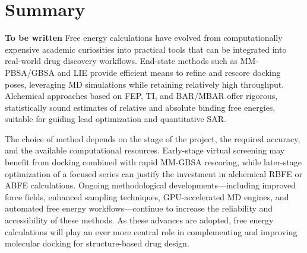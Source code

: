 \documentclass[12pt]{article}
\begin{document}
\section{Summary}

\textbf{To be written}
Free energy calculations have evolved from computationally expensive academic curiosities into practical tools that can be integrated into real-world drug discovery workflows. 
End-state methods such as MM-PBSA/GBSA and LIE provide efficient means to refine and rescore docking poses, leveraging MD simulations while retaining relatively high throughput. 
Alchemical approaches based on FEP, TI, and BAR/MBAR offer rigorous, statistically sound estimates of relative and absolute binding free energies, suitable for guiding lead optimization and quantitative SAR. 

The choice of method depends on the stage of the project, the required accuracy, and the available computational resources. 
Early-stage virtual screening may benefit from docking combined with rapid MM-GBSA rescoring, while later-stage optimization of a focused series can justify the investment in alchemical RBFE or ABFE calculations. 
Ongoing methodological developments---including improved force fields, enhanced sampling techniques, GPU-accelerated MD engines, and automated free energy workflows---continue to increase the reliability and accessibility of these methods. 
As these advances are adopted, free energy calculations will play an ever more central role in complementing and improving molecular docking for structure-based drug design. 


\end{document}
